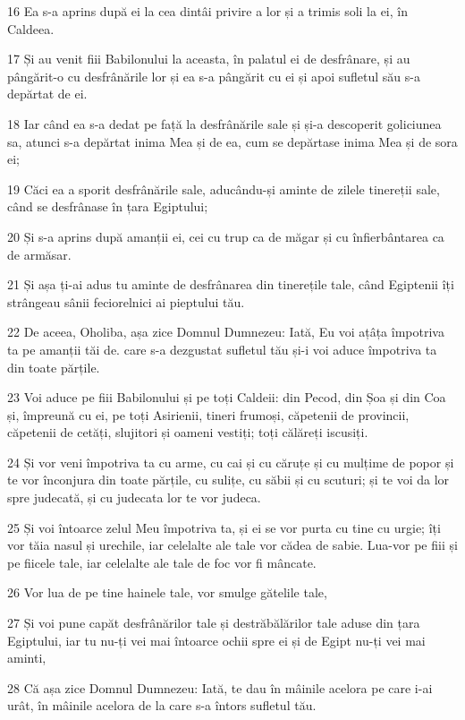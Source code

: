 \par 16 Ea s-a aprins după ei la cea dintâi privire a lor și a trimis soli la ei, în Caldeea.
\par 17 Și au venit fiii Babilonului la aceasta, în palatul ei de desfrânare, și au pângărit-o cu desfrânările lor și ea s-a pângărit cu ei și apoi sufletul său s-a depărtat de ei.
\par 18 Iar când ea s-a dedat pe față la desfrânările sale și și-a descoperit goliciunea sa, atunci s-a depărtat inima Mea și de ea, cum se depărtase inima Mea și de sora ei;
\par 19 Căci ea a sporit desfrânările sale, aducându-și aminte de zilele tinereții sale, când se desfrânase în țara Egiptului;
\par 20 Și s-a aprins după amanții ei, cei cu trup ca de măgar și cu înfierbântarea ca de armăsar.
\par 21 Și așa ți-ai adus tu aminte de desfrânarea din tinerețile tale, când Egiptenii îți strângeau sânii feciorelnici ai pieptului tău.
\par 22 De aceea, Oholiba, așa zice Domnul Dumnezeu: Iată, Eu voi ațâța împotriva ta pe amanții tăi de. care s-a dezgustat sufletul tău și-i voi aduce împotriva ta din toate părțile.
\par 23 Voi aduce pe fiii Babilonului și pe toți Caldeii: din Pecod, din Șoa și din Coa și, împreună cu ei, pe toți Asirienii, tineri frumoși, căpetenii de provincii, căpetenii de cetăți, slujitori și oameni vestiți; toți călăreți iscusiți.
\par 24 Și vor veni împotriva ta cu arme, cu cai și cu căruțe și cu mulțime de popor și te vor înconjura din toate părțile, cu sulițe, cu săbii și cu scuturi; și te voi da lor spre judecată, și cu judecata lor te vor judeca.
\par 25 Și voi întoarce zelul Meu împotriva ta, și ei se vor purta cu tine cu urgie; îți vor tăia nasul și urechile, iar celelalte ale tale vor cădea de sabie. Lua-vor pe fiii și pe fiicele tale, iar celelalte ale tale de foc vor fi mâncate.
\par 26 Vor lua de pe tine hainele tale, vor smulge gătelile tale,
\par 27 Și voi pune capăt desfrânărilor tale și destrăbălărilor tale aduse din țara Egiptului, iar tu nu-ți vei mai întoarce ochii spre ei și de Egipt nu-ți vei mai aminti,
\par 28 Că așa zice Domnul Dumnezeu: Iată, te dau în mâinile acelora pe care i-ai urât, în mâinile acelora de la care s-a întors sufletul tău.
